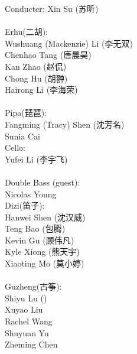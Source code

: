 \documentclass[letter,6pt,poets]{ConcProg}
\begin{document}
\begin{multicols}{2}%


Conducter: Xin Su (苏昕)
\\
\\
 Erhu(二胡):                 \\
Wushuang (Mackenzie) Li (李无双)   \\
Chenhao Tang  (唐晨昊) \\
Kan Zhao (赵侃)\\
Chong Hu (胡翀)\\
Hairong Li (李海荣)\\
\\
Pipa(琵琶):\\
Fangming (Tracy) Shen (沈芳名)\\
Sunia Cai\\

Cello:\\
Yufei Li (李宇飞)\\
\\
Double Bass (guest):\\
Nicolas Young\\

Dizi(笛子): 				 \\    
Hanwei Shen		(沈汉威)     \\
Teng Bao (包腾)\\
Kevin Gu   (顾伟凡)               \\
Kyle Xiong (熊天宇)\\
Xiaoting Mo (莫小婷)\\
\\
Guzheng(古筝):\\
Shiyu Lu ()\\
Xuyao Liu \\               
	Rachel Wang\\
Shuyuan Yu \\
Zheming Chen\\
\\
\\
\\
\end{multicols}
\end{document}
